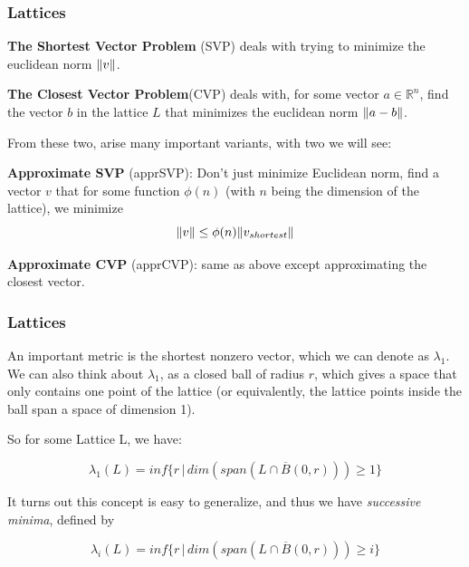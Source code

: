 \documentclass{beamer}
\DeclarePairedDelimiter{\norm}{\lVert}{\rVert}
\newcommand{\rat}{\mathbb{R}}
\begin{document}
\begin{frame}
\frametitle{Lattices}
\textbf{The Shortest Vector Problem} (SVP) deals with trying to minimize the euclidean norm $\norm{v}$.

\vspace{1em}

\textbf{The Closest Vector Problem}(CVP) deals with, for some vector $a \in \rat^n$, find the vector $b$ in the lattice $L$ that minimizes the euclidean norm $\norm{a-b}$.

From these two, arise many important variants, with two we will see:

\vspace{1em}

\textbf{Approximate SVP} (apprSVP): Don't just minimize Euclidean norm, find a vector $v$ that for some function $\phi(n)$ (with $n$ being the dimension of the lattice), we minimize
\[ \norm{v} \leq \phi(n) \norm{v_{shortest}} \]

\vspace{1em}

\textbf{Approximate CVP} (apprCVP): same as above except approximating the closest vector.

\end{frame}

\begin{frame}
\frametitle{Lattices}
An important metric is the shortest nonzero vector, which we can denote as $\lambda_1$. We can also think about $\lambda_1$, as a closed ball of radius $r$, which gives a space that only contains one point of the lattice (or equivalently, the lattice points inside the ball span a space of dimension 1).

\vspace{1em}

So for some Lattice L, we have:

\[ \lambda_1(L) = inf \{ r \, | \, dim(span(L \cap \overline{B}(0,r))) \geq 1 \} \]

It turns out this concept is easy to generalize, and thus we have \textit{successive minima}, defined by

\[ \lambda_i(L) = inf \{ r \, | \, dim(span(L \cap \overline{B}(0,r))) \geq i \} \]


\end{frame}
\end{document}
